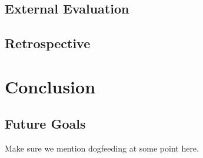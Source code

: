 \documentclass[a4paper]{l3proj}
\begin{document}
\section{External Evaluation}
\label{externalEvaluation}


\section{Retrospective}
\label{retrospective}


\chapter{Conclusion}
\label{conclusion}


\section{Future Goals}
\label{futureGoals}

Make sure we mention dogfeeding at some point here.

% 
% 
\end{document}
